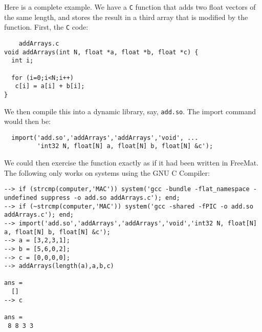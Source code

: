 Here is a complete example.  We have a \verb|C| function that adds
two float vectors of the same length, and stores the result in a third array 
that is modified by the function.  First, the \verb|C| code:
\begin{verbatim}
    addArrays.c
void addArrays(int N, float *a, float *b, float *c) {
  int i;
 
  for (i=0;i<N;i++)
   c[i] = a[i] + b[i];
}
\end{verbatim}
We then compile this into a dynamic library, say, \verb|add.so|.  The import 
command would then be:
\begin{verbatim}
  import('add.so','addArrays','addArrays','void', ...
         'int32 N, float[N] a, float[N] b, float[N] &c');
\end{verbatim}
We could then exercise the function exactly as if it had been written
in FreeMat.  The following only works on systems using the GNU
C Compiler:
\begin{verbatim}
--> if (strcmp(computer,'MAC')) system('gcc -bundle -flat_namespace -undefined suppress -o add.so addArrays.c'); end;
--> if (~strcmp(computer,'MAC')) system('gcc -shared -fPIC -o add.so addArrays.c'); end;
--> import('add.so','addArrays','addArrays','void','int32 N, float[N] a, float[N] b, float[N] &c');
--> a = [3,2,3,1];
--> b = [5,6,0,2]; 
--> c = [0,0,0,0];
--> addArrays(length(a),a,b,c)

ans = 
  []
--> c

ans = 
 8 8 3 3 
\end{verbatim}
